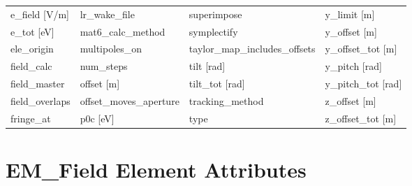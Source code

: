 \begin{tabular}{llll}
e_field [V/m]                    & lr_wake_file                     & superimpose                      & y_limit [m]                      \\
e_tot [eV]                       & mat6_calc_method                 & symplectify                      & y_offset [m]                     \\
ele_origin                       & multipoles_on                    & taylor_map_includes_offsets      & y_offset_tot [m]                 \\
field_calc                       & num_steps                        & tilt [rad]                       & y_pitch [rad]                    \\
field_master                     & offset [m]                       & tilt_tot [rad]                   & y_pitch_tot [rad]                \\
field_overlaps                   & offset_moves_aperture            & tracking_method                  & z_offset [m]                     \\
fringe_at                        & p0c [eV]                         & type                             & z_offset_tot [m]                 \\
 \bottomrule
 \end{tabular}
 \vfill
 
 \section{EM_Field Element Attributes}
 \label{s:list.em.field}
 
